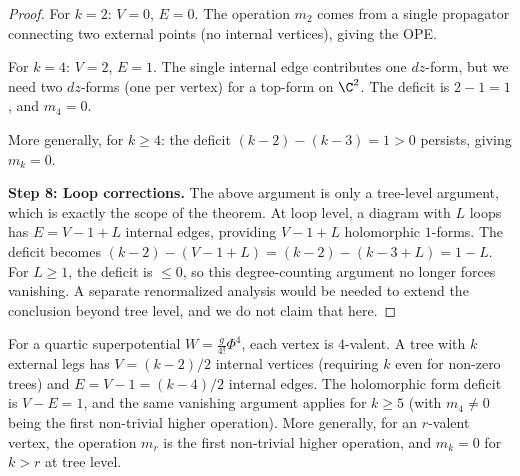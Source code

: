 \begin{proof}
For $k = 2$: $V = 0$, $E = 0$. The operation $m_2$ comes from a single propagator connecting two external points (no internal vertices), giving the OPE.

For $k = 4$: $V = 2$, $E = 1$. The single internal edge contributes one $dz$-form, but we need two $dz$-forms (one per vertex) for a top-form on $\C^2$. The deficit is $2 - 1 = 1$, and $m_4 = 0$.

More generally, for $k \geq 4$: the deficit $(k-2) - (k-3) = 1 > 0$ persists, giving $m_k = 0$.

\textbf{Step 8: Loop corrections.}
The above argument is only a tree-level argument, which is exactly the
scope of the theorem. At loop level, a diagram with $L$ loops has
$E = V - 1 + L$ internal edges, providing $V - 1 + L$ holomorphic
$1$-forms. The deficit becomes
$(k-2) - (V-1+L) = (k-2) - (k-3+L) = 1 - L$. For $L \geq 1$, the
deficit is $\leq 0$, so this degree-counting argument no longer forces
vanishing. A separate renormalized analysis would be needed to extend
the conclusion beyond tree level, and we do not claim that here.
\end{proof}

\begin{remark}
For a quartic superpotential $W = \frac{g}{4!}\Phi^4$, each vertex is $4$-valent. A tree with $k$ external legs has $V = (k-2)/2$ internal vertices (requiring $k$ even for non-zero trees) and $E = V - 1 = (k-4)/2$ internal edges. The holomorphic form deficit is $V - E = 1$, and the same vanishing argument applies for $k \geq 5$ (with $m_4 \neq 0$ being the first non-trivial higher operation). More generally, for an $r$-valent vertex, the operation $m_r$ is the first non-trivial higher operation, and $m_k = 0$ for $k > r$ at tree level.
\end{remark}

